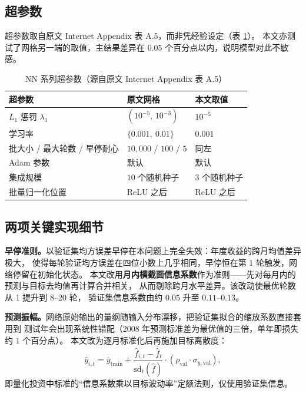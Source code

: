 \documentclass[11pt,a4paper,fontset=windows]{ctexart}
\begin{document}
\subsection{超参数}

超参数取自原文 Internet Appendix 表 A.5，而非凭经验设定（表 \ref{tab:hp}）。
本文亦测试了网格另一端的取值，主结果差异在 $0.05$ 个百分点以内，说明模型对此不敏感。

\begin{table}[htbp]
\centering
\caption{NN 系列超参数（源自原文 Internet Appendix 表 A.5）}
\label{tab:hp}
\small
\begin{tabular}{lll}
\toprule
超参数 & 原文网格 & 本文取值 \\
\midrule
$L_1$ 惩罚 $\lambda_1$ & $(10^{-5},\,10^{-3})$ & $10^{-5}$ \\
学习率 & $\{0.001,\ 0.01\}$ & $0.001$ \\
批大小 / 最大轮数 / 早停耐心 & $10{,}000$ / $100$ / $5$ & 同左 \\
Adam 参数 & 默认 & 默认 \\
集成规模 & $10$ 个随机种子 & $3$ 个随机种子 \\
批量归一化位置 & ReLU 之后 & ReLU 之后 \\
\bottomrule
\end{tabular}
\end{table}

\subsection{两项关键实现细节}

\textbf{早停准则。}以验证集均方误差早停在本问题上完全失效：年度收益的跨月均值差异极大，
使得每轮验证均方误差在四位小数上几乎相同，早停恒在第 1 轮触发，网络停留在初始化状态。
本文改用\textbf{月内横截面信息系数}作为准则——先对每月内的预测与目标去均值再计算合并相关，
从而剔除跨月水平差异。该改动使最优轮数从 1 提升到 8--20 轮，
验证集信息系数由约 $0.05$ 升至 $0.11$--$0.13$。

\textbf{预测振幅。}网络原始输出的量纲随输入分布漂移，把验证集拟合的缩放系数直接套用到
测试年会出现系统性错配（2008 年预测标准差为最优值的三倍，单年即损失约 $1$ 个百分点）。
本文改为逐月标准化后再施加目标离散度：
\begin{equation}
\hat y_{i,t} = \bar y_{\mathrm{train}} + \frac{\hat f_{i,t} - \overline{\hat f}_t}{\mathrm{sd}_t(\hat f)}
\cdot \left(\rho_{\mathrm{val}}\cdot \sigma_{y,\mathrm{val}}\right),
\end{equation}
即量化投资中标准的``信息系数乘以目标波动率''定额法则，仅使用验证集信息。
\end{document}
